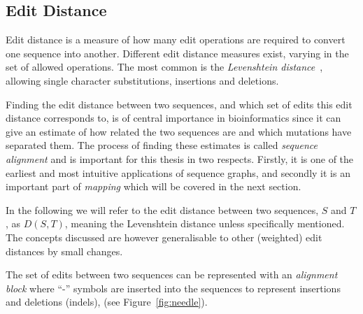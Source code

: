 \subsection{Edit Distance}
Edit distance is a measure of how many edit operations are required to convert one sequence into  another. Different edit distance measures exist, varying in the set of allowed operations. The most common is the \emph{Levenshtein distance}~\cite{levensthein}, allowing single character substitutions, insertions and deletions. 

Finding the edit distance between two sequences, and which set of edits this edit distance corresponds to, is of central importance in bioinformatics since it can give an estimate of how related the two sequences are and which mutations have separated them.
The process of finding these estimates is called \emph{sequence alignment} and is important for this thesis in two respects. Firstly, it is one of the earliest and most intuitive applications of sequence graphs, and secondly it is an important part of \emph{mapping} which will be covered in the next section. 

In the following we will refer to the edit distance between two sequences, $S$ and $T$, as $D(S, T)$, meaning the Levenshtein distance unless specifically mentioned. The concepts discussed are however generalisable to other (weighted) edit distances by small changes.

The set of edits between two sequences can be represented with an \emph{alignment block} where ``-'' symbols are inserted into the sequences to represent insertions and deletions (indels), (see Figure~\ref{fig:needle}).

